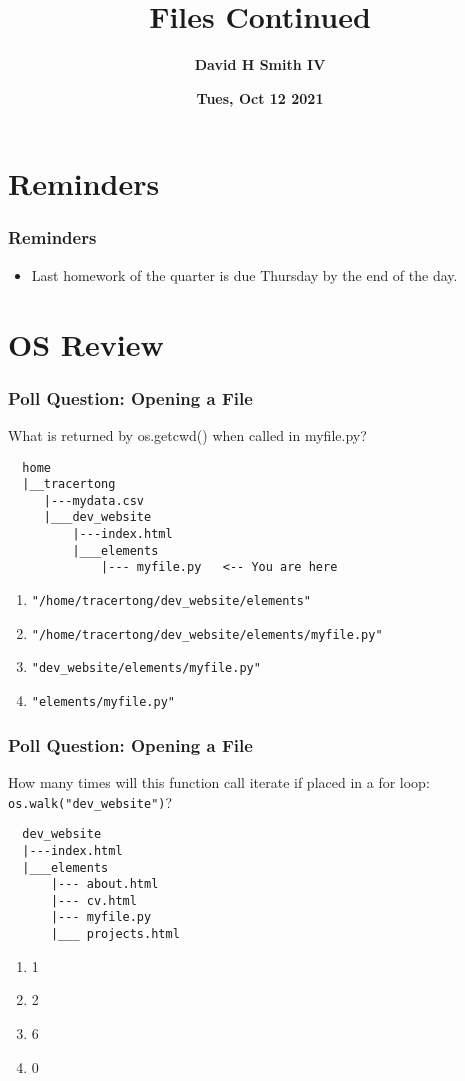 \documentclass{beamer}
\title{\textbf{Files Continued}}
\author{\textbf{David H Smith IV}}
\institute[\textbf{UIUC}]{\textbf{University of Illinois Urbana-Champaign}}
\date{\textbf{Tues, Oct 12 2021}}
\begin{document}
\frame{\titlepage}

\section{Reminders}

%
%
\begin{frame}
  \frametitle{Reminders}
  \begin{itemize}
    \item Last homework of the quarter is due Thursday by the end of the day.
  \end{itemize}
\end{frame}

\section{OS Review}

%
%
\begin{frame}[fragile]
  \frametitle{Poll Question: Opening a File}
  What is returned by os.getcwd() when called in myfile.py?
  \begin{lstlisting}
  home
  |__tracertong
     |---mydata.csv
     |___dev_website
         |---index.html
         |___elements
             |--- myfile.py   <-- You are here
  \end{lstlisting} 
  \vfill
  \begin{enumerate}[A]
    \item \lstinline|"/home/tracertong/dev_website/elements"|
    \item \lstinline|"/home/tracertong/dev_website/elements/myfile.py"|
    \item \lstinline|"dev_website/elements/myfile.py"|
    \item \lstinline|"elements/myfile.py"|
  \end{enumerate}
\end{frame}

\begin{frame}[fragile]
  \frametitle{Poll Question: Opening a File}
  How many times will this function call iterate if placed in a for loop: \lstinline|os.walk("dev_website")|?
  \begin{lstlisting}
  dev_website
  |---index.html
  |___elements
      |--- about.html
      |--- cv.html
      |--- myfile.py
      |___ projects.html
  \end{lstlisting} 
  \vfill
  \begin{enumerate}[A]
    \item 1
    \item 2
    \item 6
    \item 0
  \end{enumerate}
\end{frame}
\end{document}
